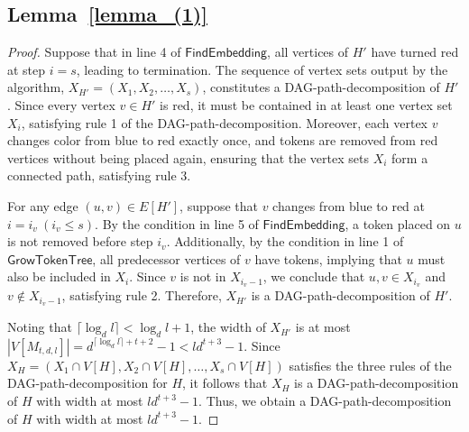 \documentclass[runningheads]{llncs}
\theoremstyle{plain}
\theoremstyle{definition}
\begin{document}
\subsection{\textbf{Lemma~\ref{lemma_(1)}}}
\begin{proof}
    Suppose that in line 4 of $\mathsf{FindEmbedding}$, all vertices of $H'$ have turned red at step $i=s$, leading to termination. The sequence of vertex sets output by the algorithm, $X_{H'} = (X_1, X_2, \dots , X_s)$, constitutes a DAG-path-decomposition of $H'$. Since every vertex $v \in H'$ is red, it must be contained in at least one vertex set $X_i$, satisfying rule 1 of the DAG-path-decomposition. Moreover, each vertex $v$ changes color from blue to red exactly once, and tokens are removed from red vertices without being placed again, ensuring that the vertex sets $X_i$ form a connected path, satisfying rule 3.

    For any edge $(u, v) \in E[H']$, suppose that $v$ changes from blue to red at $i=i_v~ (i_v \leq s)$. By the condition in line 5 of $\mathsf{FindEmbedding}$, a token placed on $u$ is not removed before step $i_v$. Additionally, by the condition in line 1 of $\mathsf{GrowTokenTree}$, all predecessor vertices of $v$ have tokens, implying that $u$ must also be included in $X_i$. Since $v$ is not in $X_{i_v-1}$, we conclude that $u, v \in X_{i_v}$ and $v \notin X_{i_v-1}$, satisfying rule 2. Therefore, $X_{H'}$ is a DAG-path-decomposition of $H'$.

    Noting that $\lceil \log_d l \rceil < \log_d l +1$, the width of $X_{H'}$ is at most $|V[M_{t, d, l}]| = d^{\lceil \log_d l \rceil +t+2}-1 < ld^{t+3}-1$. Since $X_H = (X_1 \cap V[H], X_2 \cap V[H], \dots , X_s \cap V[H])$ satisfies the three rules of the DAG-path-decomposition for $H$, it follows that $X_H$ is a DAG-path-decomposition of $H$ with width at most $ld^{t+3}-1$. Thus, we obtain a DAG-path-decomposition of $H$ with width at most $ld^{t+3}-1$.
\end{proof}
\end{document}
